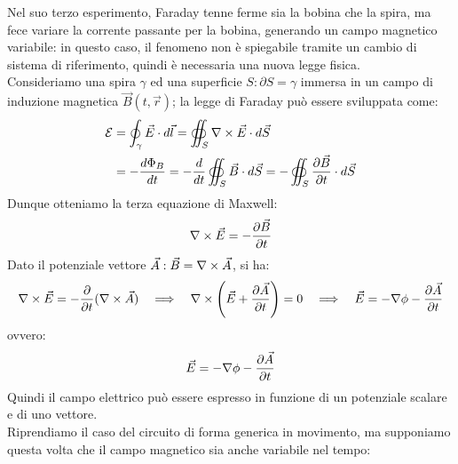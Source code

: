 Nel suo terzo esperimento, Faraday tenne ferme sia la bobina che la spira, ma fece variare la corrente passante per la bobina, generando un campo magnetico variabile: in questo caso, il fenomeno non è spiegabile tramite un cambio di sistema di riferimento, quindi è necessaria una nuova legge fisica. \\ 
%
Consideriamo una spira $ \gamma $ ed una superficie $ S : \partial S = \gamma $ immersa in un campo di induzione magnetica $ \vec{B}(t,\vec{r}) $; la legge di Faraday può essere sviluppata come:
\begin{equation}
	\begin{split}
		\mathcal{E} &= \oint_{\gamma} \vec{E} \cdot d\vec{l} = \oiint_S \nabla\times\vec{E} \cdot d\vec{S} \\ 
		   &= -\frac{d\Phi_B}{dt} = -\frac{d}{dt} \oiint_S \vec{B}\cdot d\vec{S} = - \oiint_S \frac{\partial\vec{B}}{\partial t} \cdot d\vec{S}
	\end{split}
	\label{eq:10}
\end{equation}
Dunque otteniamo la terza equazione di Maxwell:
\begin{equation}
	\nabla\times\vec{E} = -\frac{\partial\vec{B}}{\partial t}
	\label{eq:11}
\end{equation}
Dato il potenziale vettore $ \vec{A} : \vec{B} = \nabla\times\vec{A} $, si ha:
\begin{equation}
	\nabla\times\vec{E} = -\frac{\partial}{\partial t} (\nabla\times\vec{A}) \quad\Longrightarrow\quad \nabla\times\left(\vec{E} + \frac{\partial\vec{A}}{\partial t}\right) = 0 \quad\Longrightarrow\quad \vec{E} = -\nabla\phi - \frac{\partial\vec{A}}{\partial t}
	\label{eq:12}
\end{equation}
ovvero:
\begin{equation}
	\vec{E} = -\nabla\phi - \frac{\partial\vec{A}}{\partial t}
	\label{eq:13}
\end{equation}
Quindi il campo elettrico può essere espresso in funzione di un potenziale scalare e di uno vettore. \\ 
%
Riprendiamo il caso del circuito di forma generica in movimento, ma supponiamo questa volta che il campo magnetico sia anche variabile nel tempo:
